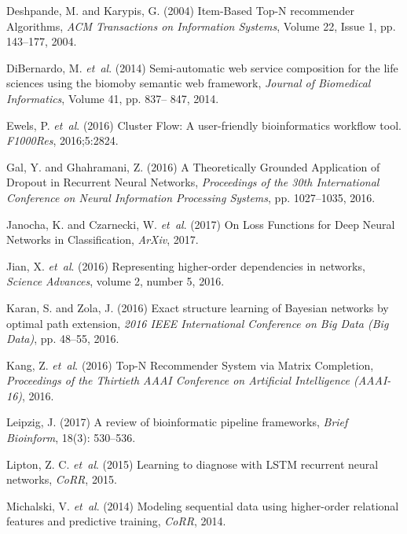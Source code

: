 \documentclass{bioinfo}
\begin{document}
\begin{thebibliography}{}
Deshpande, M. and Karypis, G. (2004) Item-Based Top-N recommender Algorithms, {\it ACM Transactions on Information Systems}, Volume 22, Issue 1, pp. 143--177, 2004.

DiBernardo, M. {\it et~al}. (2014) Semi-automatic web service composition for the life sciences using the biomoby semantic web framework, {\it Journal of Biomedical Informatics}, Volume 41, pp. 837– 847, 2014.

Ewels, P. {\it et~al}. (2016) Cluster Flow: A user-friendly bioinformatics workflow tool. {\it F1000Res}, 2016;5:2824.

Gal, Y. and Ghahramani, Z. (2016) A Theoretically Grounded Application of Dropout in Recurrent Neural Networks, {\it Proceedings of the 30th International Conference on Neural Information Processing Systems}, pp. 1027--1035, 2016.

Janocha, K. and Czarnecki, W. {\it et~al}. (2017) On Loss Functions for Deep Neural Networks in Classification, {\it ArXiv}, 2017.

Jian, X. {\it et~al}. (2016) Representing higher-order dependencies in networks, {\it Science Advances}, volume 2, number 5, 2016.

Karan, S. and Zola, J. (2016) Exact structure learning of Bayesian networks by optimal path extension, {\it 2016 IEEE International Conference on Big Data (Big Data)}, pp. 48--55, 2016.

Kang, Z. {\it et~al}. (2016) Top-N Recommender System via Matrix Completion, {\it Proceedings of the Thirtieth AAAI Conference on Artificial Intelligence (AAAI-16)}, 2016.

Leipzig, J. (2017) A review of bioinformatic pipeline frameworks, {\it Brief Bioinform}, 18(3): 530--536.

Lipton, Z. C. {\it et~al}. (2015) Learning to diagnose with LSTM recurrent neural networks, {\it CoRR}, 2015.

Michalski, V. {\it et~al}. (2014) Modeling sequential data using higher-order relational features and predictive training, {\it CoRR}, 2014.


\end{thebibliography}
\end{document}
